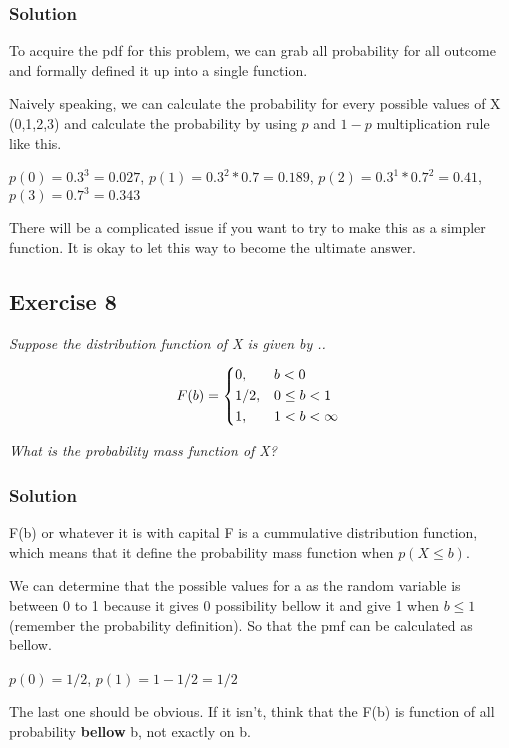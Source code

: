 \documentclass[12pt,a4paper]{article}
\begin{document}
\subsubsection{Solution}

To acquire the pdf for this problem, we can grab all probability for all outcome and formally defined it up into a single function.

Naively speaking, we can calculate the probability for every possible values of X (0,1,2,3) and calculate the probability by using $p$ and $1-p$ multiplication rule like this.

$p(0) = 0.3^3 = 0.027$,
$p(1) = 0.3^2 * 0.7 = 0.189$,
$p(2) = 0.3^1 * 0.7^2 = 0.41$,
$p(3) = 0.7^3 = 0.343$

There will be a complicated issue if you want to try to make this as a simpler function. It is okay to let this way to become the ultimate answer.

\subsection{Exercise 8}

\textit{Suppose the distribution function of X is given by .. }

\[
F(b) = \begin{dcases*}
0, & $b < 0$ \\
1/2, & $0 \leq b < 1$ \\
1, & $1 < b < \infty$ 
\end{dcases*}
\]

\textit{What is the probability mass function of X?}

\subsubsection{Solution}

F(b) or whatever it is with capital F is a cummulative distribution function, which means that it define the probability mass function when $p(X \leq b)$.

We can determine that the possible values for a as the random variable is between 0 to 1 because it gives 0 possibility bellow it and give 1 when $b \leq 1$ (remember the probability definition). So that the pmf can be calculated as bellow.

$p(0) = 1/2$,
$p(1) = 1 - 1/2 = 1/2$

The last one should be obvious. If it isn't, think that the F(b) is function of all probability \textbf{bellow} b, not exactly on b.
\end{document}
